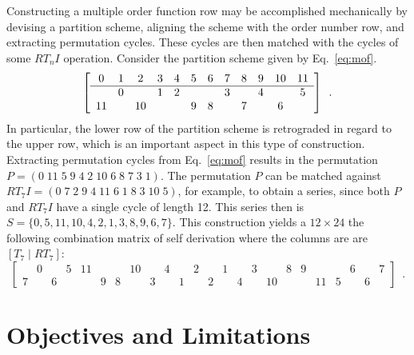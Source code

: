 \begin{example}
	\cite[241, 247]{Morris1977}
	\label{ex:mof}
	Constructing a multiple order function row may be accomplished mechanically by devising a partition scheme, aligning the scheme with the order number row, and extracting permutation cycles. These cycles are then matched with the cycles of some $RT_nI$ operation. Consider the partition scheme given by Eq.~\ref{eq:mof}.
	\newpage
	\begin{equation}
		\label{eq:mof}
		\left[
        \begin{array}{cccccccccccc}
            0  & 1 & 2  & 3 & 4 & 5 & 6 & 7 & 8 & 9 & 10 & 11 \\
            \hline
               & 0 &    & 1 & 2 &   &   & 3 &   & 4 &    & 5  \\
            11 &   & 10 &   &   & 9 & 8 &   & 7 &   & 6  &
        \end{array}
        \right] \enspace.
	\end{equation}
	\noindent In particular, the lower row of the partition scheme is retrograded in regard to the upper row, which is an important aspect in this type of construction. Extracting permutation cycles from Eq.~\ref{eq:mof} results in the permutation $P = (0 \; 11 \; 5 \; 9 \; 4 \; 2 \; 10 \; 6 \; 8 \; 7 \; 3 \; 1)$. The permutation $P$ can be matched against $RT_7I = (0 \; 7 \; 2 \; 9 \; 4 \; 11 \; 6 \; 1 \; 8 \; 3 \; 10 \; 5)$, for example, to obtain a series, since both $P$ and $RT_7I$ have a single cycle of length 12. This series then is $S = \{0, 5, 11, 10, 4, 2, 1, 3, 8, 9, 6, 7\}$. This construction yields a $12 \times 24$ the following combination matrix of self derivation where the columns are are $[T_7 \; | \; RT_7]$:
	\begin{equation}
		\left[
        \begin{array}{cccccccccccc|cccccccccccc}
        & 0 && 5 & 11 &&& 10 && 4 && 2 && 1 && 3 && 8 & 9 &&& 6 && 7 \\
        7 && 6 &&& 9 & 8 && 3 && 1 && 2 && 4 && 10 &&& 11 & 5 && 6 &
        \end{array}
        \right] \enspace.
	\end{equation}
\end{example}

\section{Objectives and Limitations}


